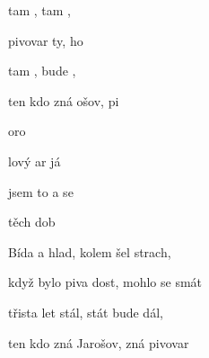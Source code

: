 

\zs
{} tam ,  tam ,

pivovar ty,  ho 

 tam ,  bude ,

ten kdo zná ošov,  pi
\ks

\zr
{}   oro

lový ar já 

 jsem to  a  se 

 těch dob  
\kr

\zs
Bída a hlad, kolem šel strach,

když bylo piva dost, mohlo se smát

třista let stál, stát bude dál,

ten kdo zná Jarošov, zná pivovar
\ks

\zr \kr


\kp


